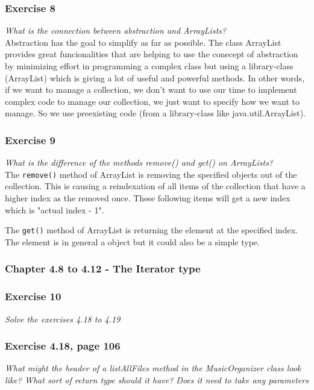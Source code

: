 \subsubsection*{Exercise 8}
\textit{What is the connection between abstraction and ArrayLists?}\\

Abstraction has the goal to simplify as far as possible. The class
ArrayList provides great funcionalities that are helping to use the 
conecept of abstraction by minimizing effort in programming a complex
class but using a library-class (ArrayList) which is giving a lot of
useful and powerful methods. In other words, if we want to manage a
collection, we don't want to use our time to implement complex code
to manage our collection, we just want to specify how we want to 
manage. So we use preexisting code (from a library-class like 
java.util.ArrayList).

\subsubsection*{Exercise 9}
\textit{What is the difference of the methods remove() and get() on
ArrayLists?}\\

The \lstinline{remove()} method of ArrayList is removing the specified
objects out of the collection. This is causing a reindexation of all
items of the collection that have a higher index as the removed once.
These following items will get a new index which is "actual index - 1".

The \lstinline{get()} method of ArrayList is returning the element at
the specified index. The element is in general a object but it could 
also be a simple type.

\subsubsection{Chapter 4.8 to 4.12 - The Iterator type}

\subsubsection*{Exercise 10}
\textit{Solve the exercises 4.18 to 4.19}\\

\subsubsection*{Exercise 4.18, page 106}
\textit{What might the header of a listAllFiles method in the MusicOrganizer
class look like? What sort of return type should it have? Does it need to 
take any parameters}\\

